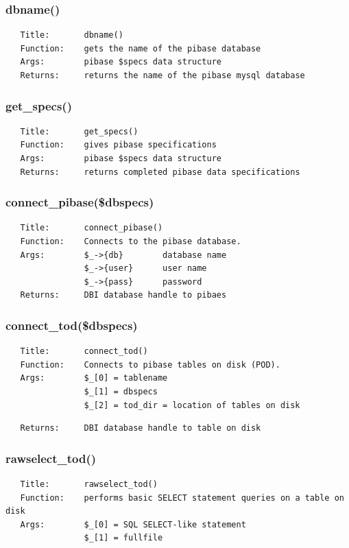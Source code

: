 \documentclass{article}
\begin{document}
\subsubsection*{dbname()\label{pibase_pm_dbname_}}
\begin{verbatim}
   Title:       dbname()
   Function:    gets the name of the pibase database
   Args:        pibase $specs data structure
   Returns:     returns the name of the pibase mysql database
\end{verbatim}
\subsubsection*{get\_specs()\label{pibase_pm_get_specs_}}
\begin{verbatim}
   Title:       get_specs()
   Function:    gives pibase specifications
   Args:        pibase $specs data structure
   Returns:     returns completed pibase data specifications
\end{verbatim}
\subsubsection*{connect\_pibase(\$dbspecs)\label{pibase_pm_connect_pibase_dbspecs_}}
\begin{verbatim}
   Title:       connect_pibase()
   Function:    Connects to the pibase database.
   Args:        $_->{db}        database name
                $_->{user}      user name
                $_->{pass}      password
   Returns:     DBI database handle to pibaes
\end{verbatim}
\subsubsection*{connect\_tod(\$dbspecs)\label{pibase_pm_connect_tod_dbspecs_}}
\begin{verbatim}
   Title:       connect_tod()
   Function:    Connects to pibase tables on disk (POD).
   Args:        $_[0] = tablename
                $_[1] = dbspecs
                $_[2] = tod_dir = location of tables on disk
\end{verbatim}
\begin{verbatim}
   Returns:     DBI database handle to table on disk
\end{verbatim}
\subsubsection*{rawselect\_tod()\label{pibase_pm_rawselect_tod_}}
\begin{verbatim}
   Title:       rawselect_tod()
   Function:    performs basic SELECT statement queries on a table on disk
   Args:        $_[0] = SQL SELECT-like statement
                $_[1] = fullfile
\end{verbatim}
\end{document}
